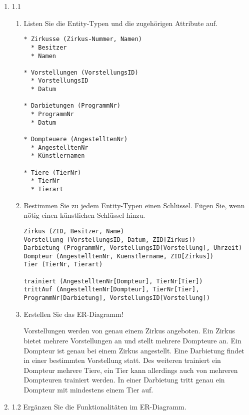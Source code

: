 \documentclass{bschlangaul-aufgabe}
\begin{document}
\begin{enumerate}
\item 1.1

\begin{enumerate}


\item Listen Sie die Entity-Typen und die zugehörigen Attribute auf.

\begin{verbatim}
* Zirkusse (Zirkus-Nummer, Namen)
  * Besitzer
  * Namen

* Vorstellungen (VorstellungsID)
  * VorstellungsID
  * Datum

* Darbietungen (ProgrammNr)
  * ProgrammNr
  * Datum

* Dompteuere (AngestelltenNr)
  * AngestelltenNr
  * Künstlernamen

* Tiere (TierNr)
  * TierNr
  * Tierart
\end{verbatim}


\item Bestimmen Sie zu jedem Entity-Typen einen Schlüssel.
Fügen Sie, wenn nötig einen künstlichen Schlüssel hinzu.

\begin{verbatim}
Zirkus (ZID, Besitzer, Name)
Vorstellung (VorstellungsID, Datum, ZID[Zirkus])
Darbietung (ProgrammNr, VorstellungsID[Vorstellung], Uhrzeit)
Dompteur (AngestelltenNr, Kuenstlername, ZID[Zirkus])
Tier (TierNr, Tierart)

trainiert (AngestelltenNr[Dompteur], TierNr[Tier])
trittAuf (AngestelltenNr[Dompteur], TierNr[Tier], ProgrammNr[Darbietung], VorstellungsID[Vorstellung])
\end{verbatim}


\item Erstellen Sie das ER-Diagramm!

Vorstellungen werden von genau einem Zirkus angeboten. Ein Zirkus bietet
mehrere Vorstellungen an und stellt mehrere Dompteure an. Ein Dompteur
ist genau bei einem Zirkus angestellt. Eine Darbietung findet in einer
bestimmten Vorstellung statt. Des weiteren trainiert ein Dompteur
mehrere Tiere, ein Tier kann allerdings auch von mehreren Dompteuren
trainiert werden. In einer Darbietung tritt genau ein Dompteur mit
mindestens einem Tier auf.
\end{enumerate}

\item 1.2 Ergänzen Sie die Funktionalitäten im ER-Diagramm.


\end{enumerate}
\end{document}
